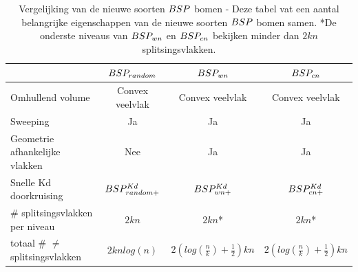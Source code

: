 \begin{table}[tb]
    \centering
    \begin{tabular}{@{}|l|c|c|c|@{}} \toprule      
            & $BSP_{random}$     & $BSP_{wn}$ & $BSP_{cn}$ \\ \midrule
      Omhullend volume & Convex veelvlak & Convex veelvlak & Convex veelvlak \\
      Sweeping                              &  Ja   & Ja & Ja    \\
      Geometrie afhankelijke vlakken & Nee & Ja & Ja \\
      Snelle Kd doorkruising                 & $BSP^{Kd}_{random+}$  & $BSP^{Kd}_{wn+}$  & $BSP^{Kd}_{cn+}$    \\
      \# splitsingsvlakken per niveau       &  $2kn$   & $2kn$* & $2kn$*  \\
      totaal \# $\neq$ splitsingsvlakken           &  $2knlog(n)$   & $2(log(\frac{n}{k}) + \frac{1}{2})kn$ & $2(log(\frac{n}{k}) + \frac{1}{2})kn$     \\ \bottomrule
    \end{tabular}
    \caption[Vergelijking van de nieuwe soorten $\symBSP$ bomen.]{Vergelijking van de nieuwe soorten $\symBSP$ bomen - \small Deze tabel vat een aantal belangrijke eigenschappen van de nieuwe soorten $\symBSP$ bomen samen. *De onderste niveaus van $BSP_{wn}$ en $BSP_{cn}$ bekijken minder dan $2kn$ splitsingsvlakken.}
    \label{tab:boom-vergelijking-sweep}
  \end{table}


